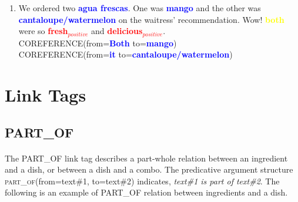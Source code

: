 \documentclass{article}
\begin{document}
\begin{enumerate}[resume]
	\item We ordered two \textbf{\textcolor{blue}{agua frescas}}. One was  \textbf{\textcolor{blue}{mango}} and the other was 
	\textbf{\textcolor{blue}{cantaloupe/watermelon}} on the waitress' recommendation. Wow! 
	\textbf{\textcolor{yellow}{both}} were so 
	\textbf{\textcolor{red}{fresh$_{positive}$}} and 
	\textbf{\textcolor{red}{delicious$_{positive}$}}.\\
	
		\textsc{COREFERENCE}(from=\textbf{\textcolor{blue}{Both}} to=\textbf{\textcolor{blue}{mango}}) \\
		\textsc{COREFERENCE}(from=\textbf{\textcolor{blue}{it}} to=\textbf{\textcolor{blue}{cantaloupe/watermelon}}) \\
	
\end{enumerate}

\newpage
\section{Link Tags}


\subsection{PART\_OF}
\paragraph{}
The PART\_OF link tag describes a part-whole relation between an ingredient and a dish, or between a dish and a combo. The predicative argument structure \textsc{part\_of}(from=text\#1, to=text\#2) indicates, \textit{text\#1 is part of text\#2}. The following is an example of PART\_OF relation between ingredients and a dish.
\end{document}
